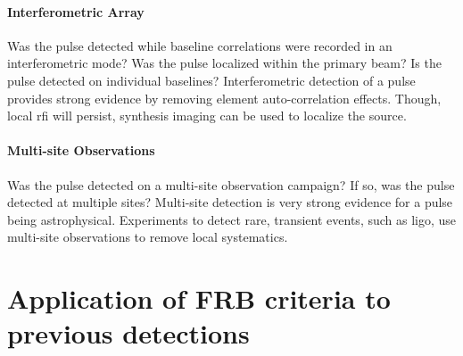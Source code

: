 \documentclass[a4paper,fleqn,usenatbib]{mnras}
\begin{document}
\paragraph{Interferometric Array}

Was the pulse detected while baseline correlations were recorded in an
interferometric mode? Was the pulse localized within the primary beam? Is the
pulse detected on individual baselines? Interferometric detection of a pulse
provides strong evidence by removing element auto-correlation effects. Though,
local \gls{rfi} will persist, synthesis imaging can be used to localize the
source.

\paragraph{Multi-site Observations}

Was the pulse detected on a multi-site observation campaign? If so, was the
pulse detected at multiple sites? Multi-site detection is very strong evidence
for a pulse being astrophysical. Experiments to detect rare, transient events,
such as \gls{ligo}, use multi-site observations to remove local systematics.

\section{Application of FRB criteria to previous detections}
\label{sec:appln_to_previous_detections}
\end{document}
